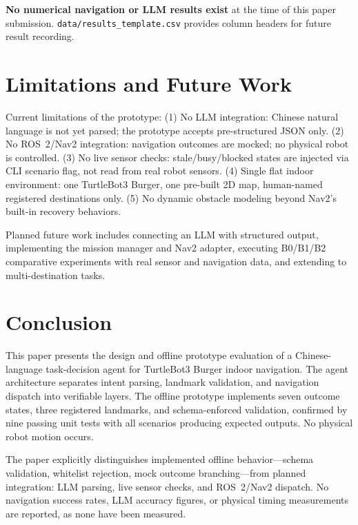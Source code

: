 \documentclass[conference]{IEEEtran}
\begin{document}
\noindent\textbf{No numerical navigation or LLM results exist} at the time of this
paper submission. \texttt{data/results\_template.csv} provides column headers for
future result recording.

\section{Limitations and Future Work}

Current limitations of the prototype:
(1) No LLM integration: Chinese natural language is not yet parsed; the prototype
    accepts pre-structured JSON only.
(2) No ROS~2/Nav2 integration: navigation outcomes are mocked; no physical robot is
    controlled.
(3) No live sensor checks: stale/busy/blocked states are injected via CLI scenario
    flag, not read from real robot sensors.
(4) Single flat indoor environment: one TurtleBot3 Burger, one pre-built 2D map,
    human-named registered destinations only.
(5) No dynamic obstacle modeling beyond Nav2's built-in recovery behaviors.

Planned future work includes connecting an LLM with structured output, implementing
the mission manager and Nav2 adapter, executing B0/B1/B2 comparative experiments
with real sensor and navigation data, and extending to multi-destination tasks.

\section{Conclusion}

This paper presents the design and offline prototype evaluation of a Chinese-language
task-decision agent for TurtleBot3 Burger indoor navigation. The agent architecture
separates intent parsing, landmark validation, and navigation dispatch into verifiable
layers. The offline prototype implements seven outcome states, three registered
landmarks, and schema-enforced validation, confirmed by nine passing unit tests with
all scenarios producing expected outputs. No physical robot motion occurs.

The paper explicitly distinguishes implemented offline behavior---schema validation,
whitelist rejection, mock outcome branching---from planned integration: LLM parsing,
live sensor checks, and ROS~2/Nav2 dispatch. No navigation success rates, LLM accuracy
figures, or physical timing measurements are reported, as none have been measured.
\end{document}

